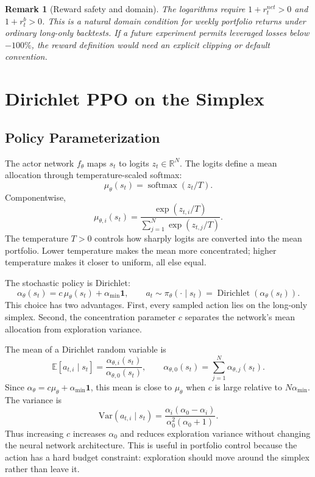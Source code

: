 \documentclass[11pt]{article}
\newtheorem{remark}{Remark}
\newcommand{\E}{\mathbb{E}}
\newcommand{\R}{\mathbb{R}}
\newcommand{\Var}{\mathrm{Var}}
\newcommand{\1}{\mathbf{1}}
\begin{document}
\begin{remark}[Reward safety and domain]
The logarithms require $1+r^{net}_t>0$ and $1+r^b_t>0$. This is a natural
domain condition for weekly portfolio returns under ordinary long-only
backtests. If a future experiment permits leveraged losses below $-100\%$, the
reward definition would need an explicit clipping or default convention.
\end{remark}

\section{Dirichlet PPO on the Simplex}

\subsection{Policy Parameterization}

The actor network $f_\theta$ maps $s_t$ to logits $z_t \in \R^N$. The logits
define a mean allocation through temperature-scaled softmax:
\[
\mu_\theta(s_t) =
\operatorname{softmax}(z_t/T).
\]
Componentwise,
\[
\mu_{\theta,i}(s_t)
=
\frac{\exp(z_{t,i}/T)}
{\sum_{j=1}^{N}\exp(z_{t,j}/T)}.
\]
The temperature $T>0$ controls how sharply logits are converted into the mean
portfolio. Lower temperature makes the mean more concentrated; higher
temperature makes it closer to uniform, all else equal.

The stochastic policy is Dirichlet:
\[
\alpha_\theta(s_t) = c\,\mu_\theta(s_t)+\alpha_{\min}\mathbf{1},
\qquad
a_t \sim \pi_\theta(\cdot \mid s_t)
= \operatorname{Dirichlet}(\alpha_\theta(s_t)).
\]
This choice has two advantages. First, every sampled action lies on the
long-only simplex. Second, the concentration parameter $c$ separates the
network's mean allocation from exploration variance.

The mean of a Dirichlet random variable is
\[
\E[a_{t,i}\mid s_t]
=
\frac{\alpha_{\theta,i}(s_t)}
{\alpha_{\theta,0}(s_t)},
\qquad
\alpha_{\theta,0}(s_t)=\sum_{j=1}^{N}\alpha_{\theta,j}(s_t).
\]
Since $\alpha_\theta=c\mu_\theta+\alpha_{\min}\1$, this mean is close to
$\mu_\theta$ when $c$ is large relative to $N\alpha_{\min}$. The variance is
\[
\Var(a_{t,i}\mid s_t)=
\frac{\alpha_i(\alpha_0-\alpha_i)}
{\alpha_0^2(\alpha_0+1)}.
\]
Thus increasing $c$ increases $\alpha_0$ and reduces exploration variance
without changing the neural network architecture. This is useful in portfolio
control because the action has a hard budget constraint: exploration should
move around the simplex rather than leave it.
\end{document}
